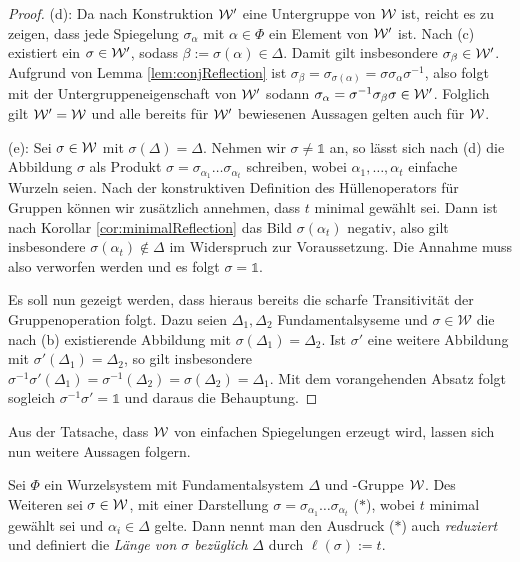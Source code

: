 \begin{proof}
  (d):
  Da nach Konstruktion $\mathcal{W}'$ eine Untergruppe von $\mathcal{W}$ ist, reicht es zu zeigen, dass jede Spiegelung $\sigma_\alpha$ mit $\alpha \in \Phi$ ein Element von $\mathcal{W}'$ ist.
  Nach (c) existiert ein $\sigma \in \mathcal{W}'$, sodass $\beta := \sigma(\alpha) \in \Delta$.
  Damit gilt insbesondere $\sigma_\beta \in \mathcal{W}'$.
  Aufgrund von Lemma \ref{lem:conjReflection} ist $\sigma_\beta = \sigma_{\sigma(\alpha)} = \sigma \sigma_\alpha \sigma^{-1}$, also folgt mit der Untergruppeneigenschaft von $\mathcal{W}'$ sodann $\sigma_\alpha = \sigma^{-1} \sigma_\beta \sigma \in \mathcal{W}'$.
  Folglich gilt $\mathcal{W}' = \mathcal{W}$ und alle bereits für $\mathcal{W}'$ bewiesenen Aussagen gelten auch für $\mathcal{W}$.

  (e):
  Sei $\sigma \in \mathcal{W}$ mit $\sigma(\Delta) = \Delta$.
  Nehmen wir $\sigma \neq \mathds{1}$ an, so lässt sich nach (d) die Abbildung $\sigma$ als Produkt $\sigma = \sigma_{\alpha_1}\dots\sigma_{\alpha_t}$ schreiben, wobei $\alpha_1,\dots,\alpha_t$ einfache Wurzeln seien. 
  Nach der konstruktiven Definition des Hüllenoperators für Gruppen können wir zusätzlich annehmen, dass $t$ minimal gewählt sei.
  Dann ist nach Korollar \ref{cor:minimalReflection} das Bild $\sigma(\alpha_t)$ negativ, also gilt insbesondere $\sigma(\alpha_t) \not\in \Delta$ im Widerspruch zur Voraussetzung.
  Die Annahme muss also verworfen werden und es folgt $\sigma = \mathds{1}$.

  Es soll nun gezeigt werden, dass hieraus bereits die scharfe Transitivität der Gruppenoperation folgt.
  Dazu seien $\Delta_1,\Delta_2$ Fundamentalsyseme und $\sigma \in \mathcal{W}$ die nach (b) existierende Abbildung mit $\sigma(\Delta_1) = \Delta_2$.
  Ist $\sigma'$ eine weitere Abbildung mit $\sigma'(\Delta_1) = \Delta_2$, so gilt insbesondere $\sigma^{-1} \sigma'(\Delta_1) = \sigma^{-1}(\Delta_2) = \sigma(\Delta_2) = \Delta_1$.
  Mit dem vorangehenden Absatz folgt sogleich $\sigma^{-1} \sigma' = \mathds{1}$ und daraus die Behauptung.
\end{proof}

Aus der Tatsache, dass $\mathcal{W}$ von einfachen Spiegelungen erzeugt wird, lassen sich nun weitere Aussagen folgern.

\begin{defn}
  Sei $\Phi$ ein Wurzelsystem mit Fundamentalsystem $\Delta$ und \weyl\hyp{}Gruppe $\mathcal{W}$. 
  Des Weiteren sei $\sigma \in \mathcal{W}$, mit einer Darstellung $\sigma = \sigma_{\alpha_1}\dots\sigma_{\alpha_t}$ ($\ast$), wobei $t$ minimal gewählt sei und $\alpha_i \in \Delta$ gelte. 
  Dann nennt man den Ausdruck ($\ast$) auch \emph{reduziert} und definiert die \emph{Länge von $\sigma$ bezüglich} $\Delta$ durch $\ell(\sigma) := t$.
\end{defn}

